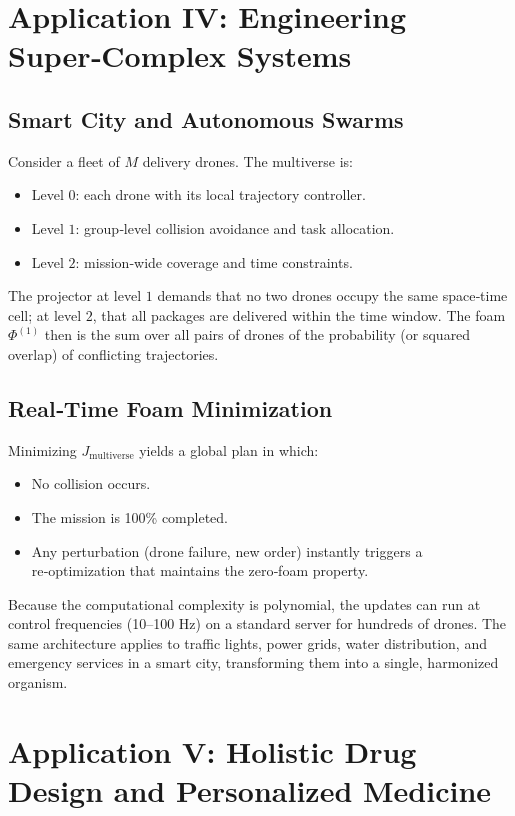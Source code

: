 \documentclass[11pt,a4paper]{article}
\theoremstyle{definition}
\newcommand{\Foam}{\Phi}
\newcommand{\Jfunc}{J_{\text{multiverse}}}
\begin{document}
\section{Application IV: Engineering Super‑Complex Systems}

\subsection{Smart City and Autonomous Swarms}

Consider a fleet of $M$ delivery drones. The multiverse is:
\begin{itemize}
    \item Level $0$: each drone with its local trajectory controller.
    \item Level $1$: group‑level collision avoidance and task allocation.
    \item Level $2$: mission‑wide coverage and time constraints.
\end{itemize}

The projector at level $1$ demands that no two drones occupy the same space‑time cell; at level $2$, that all packages are delivered within the time window. The foam $\Foam^{(1)}$ then is the sum over all pairs of drones of the probability (or squared overlap) of conflicting trajectories.

\subsection{Real‑Time Foam Minimization}

Minimizing $\Jfunc$ yields a global plan in which:
\begin{itemize}
    \item No collision occurs.
    \item The mission is 100\% completed.
    \item Any perturbation (drone failure, new order) instantly triggers a re‑optimization that maintains the zero‑foam property.
\end{itemize}
Because the computational complexity is polynomial, the updates can run at control frequencies (10–100 Hz) on a standard server for hundreds of drones. The same architecture applies to traffic lights, power grids, water distribution, and emergency services in a smart city, transforming them into a single, harmonized organism.

\section{Application V: Holistic Drug Design and Personalized Medicine}
\end{document}
